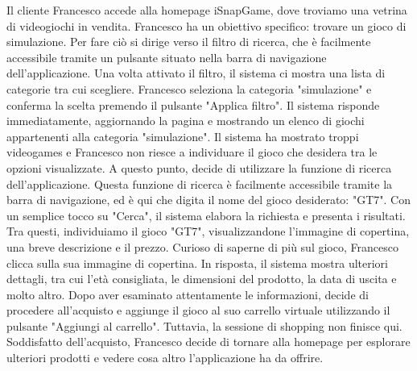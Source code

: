 \documentclass[12pt, a4paper, oneside]{book}
\begin{document}
    Il cliente Francesco accede alla homepage iSnapGame, dove troviamo una vetrina di videogiochi in vendita.
    Francesco ha un obiettivo specifico: trovare un gioco di simulazione. Per fare ciò si dirige verso il filtro di
    ricerca, che è facilmente accessibile tramite un pulsante situato nella barra di navigazione dell'applicazione.
    Una volta attivato il filtro, il sistema ci mostra una lista di categorie tra cui scegliere. Francesco seleziona la
    categoria "simulazione" e conferma la scelta premendo il pulsante "Applica filtro". Il sistema risponde
    immediatamente, aggiornando la pagina e mostrando un elenco di giochi appartenenti alla categoria "simulazione".
    Il sistema ha mostrato troppi videogames e Francesco non riesce a individuare il gioco che desidera tra le opzioni
    visualizzate. A questo punto, decide di utilizzare la funzione di ricerca dell'applicazione. Questa funzione di
    ricerca è facilmente accessibile tramite la barra di navigazione, ed è qui che digita il nome del gioco
    desiderato: "GT7". Con un semplice tocco su "Cerca", il sistema elabora la richiesta e presenta i risultati.
    Tra questi, individuiamo il gioco "GT7", visualizzandone l'immagine di copertina, una breve descrizione e il prezzo.
    Curioso di saperne di più sul gioco, Francesco clicca sulla sua immagine di copertina. In risposta, il sistema
    mostra ulteriori dettagli, tra cui l'età consigliata, le dimensioni del prodotto, la data di uscita e molto altro.
    Dopo aver esaminato attentamente le informazioni, decide di procedere all'acquisto e aggiunge il gioco al suo
    carrello virtuale utilizzando il pulsante "Aggiungi al carrello". Tuttavia, la sessione di shopping non finisce qui.
    Soddisfatto dell'acquisto, Francesco decide di tornare alla homepage per esplorare ulteriori prodotti e vedere cosa
    altro l'applicazione ha da offrire.
\end{document}
